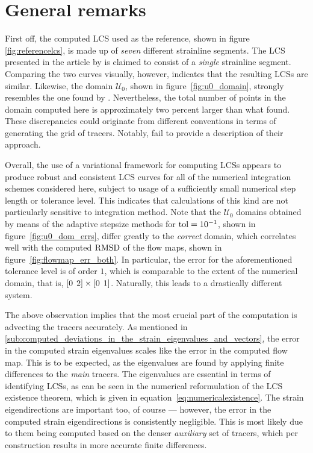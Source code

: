 \section{General remarks}
\label{sec:general_remarks}

First off, the computed LCS used as the reference, shown in figure
\ref{fig:referencelcs}, is made up of \emph{seven} different strainline segments.
The LCS presented in the article by \textcite{farazmand2012computing} is claimed
to consist of a \emph{single} strainline segment. Comparing the two curves
visually, however, indicates that the resulting LCSs are similar. Likewise, the
domain $\mathcal{U}_{0}$, shown in figure~\ref{fig:u0_domain}, strongly
resembles the one found by \citeauthor{farazmand2012computing}. Nevertheless,
the total number of points in the domain computed here is approximately two
percent larger than what \citeauthor{farazmand2012computing} found. These
discrepancies could originate from different conventions in terms of generating
the grid of tracers. Notably, \citeauthor{farazmand2012computing} fail to
provide a description of their approach.

Overall, the use of a variational framework for computing LCSs appears to
produce robust and consistent LCS curves for all of the numerical integration
schemes considered here, subject to usage of a sufficiently small numerical
step length or tolerance level. This indicates that calculations of this kind
are not particularly sensitive to integration method. Note that the
$\mathcal{U}_{0}$ domains obtained by means of the adaptive stepsize methods
for $\textnormal{tol}=10^{-1}$, shown in figure~\ref{fig:u0_dom_errs}, differ
greatly to the \emph{correct} domain, which correlates well with the computed
$\operatorname{RMSD}$ of the flow maps, shown in figure~\ref{fig:flowmap_err_both}. In
particular, the error for the aforementioned tolerance level is of order $1$,
which is comparable to the extent of the numerical domain, that is,
$[0\hspace{1ex}2]\times[0\hspace{1ex}1]$. Naturally, this leads to a drastically
different system.

The above observation implies that the most crucial part of the computation is
advecting the tracers accurately. As mentioned in
\cref{sub:computed_deviations_in_the_strain_eigenvalues_and_vectors}, the error
in the computed strain eigenvalues scales like the error in the computed flow
map. This is to be expected, as the eigenvalues are found by applying finite
differences to the \emph{main} tracers. The eigenvalues are essential in terms
of identifying LCSs, as can be seen in the numerical reformulation of the
LCS existence theorem, which is given in equation~\eqref{eq:numericalexistence}.
The strain eigendirections are important too, of course --- however, the
error in the computed strain eigendirections is consistently negligible.
This is most likely due to them being computed based on the denser
\emph{auxiliary} set of tracers, which per construction results in more accurate
finite differences.

